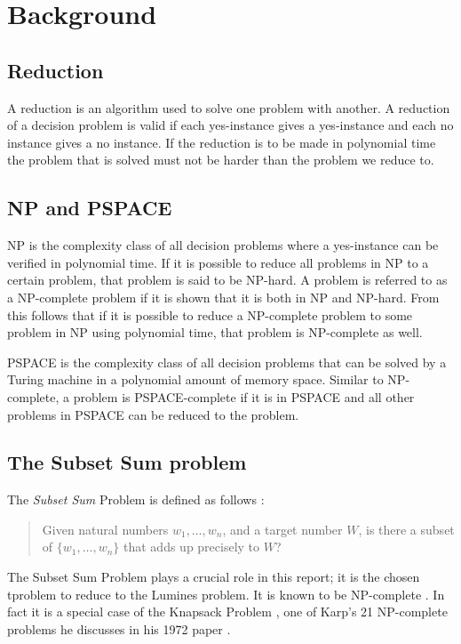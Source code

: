 \section{Background}
\label{sec:background}

\subsection{Reduction}
A reduction is an algorithm used to solve one problem with another. A reduction of a decision problem is valid if each yes-instance gives a yes-instance and each no instance gives a no instance. If the reduction is to be made in polynomial time the problem that is solved must not be harder than the problem we reduce to.\cite{reduction}

\subsection{NP and PSPACE}
NP is the complexity class of all decision problems where a yes-instance can be verified in polynomial time. If it is possible to reduce all problems in NP to a certain problem, that problem is said to be NP-hard. A problem is referred to as a NP-complete problem if it is shown that it is both in NP and NP-hard. From this follows that if it is possible to reduce a NP-complete problem to some problem in NP using polynomial time, that problem is NP-complete as well.

PSPACE is the complexity class of all decision problems that can be solved by a Turing machine in a polynomial amount of memory space. Similar to NP-complete, a problem is PSPACE-complete if it is in PSPACE and all other problems in PSPACE can be reduced to the problem.

\subsection{The Subset Sum problem}

The \textit{Subset Sum} Problem is defined as follows \cite[p.~491]{algorithm}:

\begin{quote}
Given natural numbers $w_1, \ldots, w_n$, and a target number $W$, is there a subset of $\{w_1, \ldots, w_n \}$ that adds up precisely to $W$?
\end{quote}

The Subset Sum Problem plays a crucial role in this report; it is the chosen tproblem to reduce to the Lumines problem. It is known to be NP-complete \cite[p.~492]{algorithm}. In fact it is a special case of the Knapsack Problem \cite[p.~491]{algorithm}, one of Karp's 21 NP-complete problems he discusses in his 1972 paper \cite{karp}.

